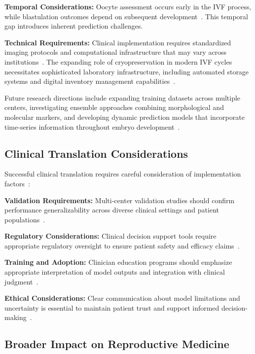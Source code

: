 \textbf{Temporal Considerations:} Oocyte assessment occurs early in the IVF process, while blastulation outcomes depend on subsequent development~\cite{meseguer2011morphokinetics}. This temporal gap introduces inherent prediction challenges.

\textbf{Technical Requirements:} Clinical implementation requires standardized imaging protocols and computational infrastructure that may vary across institutions~\cite{mortimer2015quality}. The expanding role of cryopreservation in modern IVF cycles necessitates sophisticated laboratory infrastructure, including automated storage systems and digital inventory management capabilities~\cite{go2023deep}.

Future research directions include expanding training datasets across multiple centers, investigating ensemble approaches combining morphological and molecular markers, and developing dynamic prediction models that incorporate time-series information throughout embryo development~\cite{meseguer2011morphokinetics}.

\subsection{Clinical Translation Considerations}

Successful clinical translation requires careful consideration of implementation factors~\cite{fda2022clinical,rajkomar2019machine}:

\textbf{Validation Requirements:} Multi-center validation studies should confirm performance generalizability across diverse clinical settings and patient populations~\cite{varoquaux2022machine}.

\textbf{Regulatory Considerations:} Clinical decision support tools require appropriate regulatory oversight to ensure patient safety and efficacy claims~\cite{fda2021ai,fda2022clinical}.

\textbf{Training and Adoption:} Clinician education programs should emphasize appropriate interpretation of model outputs and integration with clinical judgment~\cite{topol2019high}.

\textbf{Ethical Considerations:} Clear communication about model limitations and uncertainty is essential to maintain patient trust and support informed decision-making~\cite{beauchamp2019principles}.

\subsection{Broader Impact on Reproductive Medicine}

